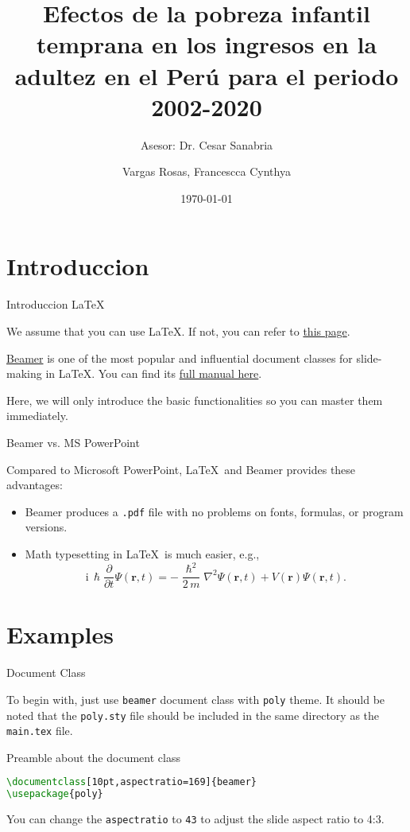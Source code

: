 \documentclass[10pt,aspectratio=169]{beamer}
\title{Efectos de la pobreza infantil temprana en los ingresos en la adultez en el Perú
para el periodo 2002-2020}
\subtitle{ Asesor: Dr. Cesar Sanabria}
\author{Vargas Rosas, Francescca Cynthya}
\institute[FCE]{Facultad de Ciencias Economicas}
\date{\today}
\begin{document}
\maketitle %

\section{Introduccion}

\begin{frame}{Introduccion \LaTeX}

	We assume that you can use \LaTeX. If not, you can refer to \href{https://www.overleaf.com/learn/latex/Learn_LaTeX_in_30_minutes}{this page}.

	\href{https://www.overleaf.com/learn/latex/Beamer}{Beamer} is one of the most popular and influential document classes for slide-making in \LaTeX. You can find its \href{https://mirror-hk.koddos.net/CTAN/macros/latex/contrib/beamer/doc/beameruserguide.pdf}{full manual here}.

	Here, we will only introduce the basic functionalities so you can master them immediately.
\end{frame}


\begin{frame}{Beamer vs. MS PowerPoint}

	Compared to Microsoft PowerPoint, \LaTeX\ and Beamer provides these advantages:
	
	\begin{itemize}
		\item Beamer produces a \texttt{.pdf} file with no problems on fonts, formulas, or program versions.
		\item Math typesetting in \LaTeX\ is much easier, e.g.,
			\begin{equation*}
				\mathrm{i}\,\hslash\frac{\partial}{\partial t} \Psi(\mathbf{r},t) =
				-\frac{\hslash^2}{2\,m}\nabla^2\Psi(\mathbf{r},t)
				+ V(\mathbf{r})\Psi(\mathbf{r},t).
			\end{equation*}
	\end{itemize}
\end{frame}

\section{Examples}

\begin{frame}[fragile]{Document Class}

	To begin with, just use \texttt{beamer} document class with \texttt{poly} theme. It should be noted that the \texttt{poly.sty} file should be included in the same directory as the \texttt{main.tex} file.
	
\begin{block}{Preamble about the document class}
\begin{lstlisting}[language=TeX]
\documentclass[10pt,aspectratio=169]{beamer}
\usepackage{poly}
\end{lstlisting}
\end{block}
	
	You can change the \texttt{aspectratio} to \texttt{43} to adjust the slide aspect ratio to 4:3.
\end{frame}
\end{document}
